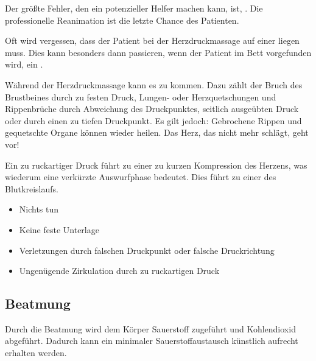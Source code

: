 {
Der größte Fehler, den ein potenzieller Helfer machen
kann, ist, . Die professionelle
Reanimation ist die letzte Chance des Patienten. 

Oft wird vergessen, dass der Patient bei der
Herzdruckmassage auf einer  liegen
muss. Dies kann besonders dann passieren, wenn der Patient
im Bett vorgefunden wird, ein .

Während der Herzdruckmassage kann es zu  kommen.
Dazu zählt der Bruch des Brustbeines durch zu festen Druck,
Lungen- oder Herzquetschungen und Rippenbrüche durch
Abweichung des Druckpunktes, seitlich ausgeübten Druck oder
durch einen zu tiefen Druckpunkt. Es gilt jedoch: Gebrochene
Rippen und gequetschte Organe können wieder heilen. Das
Herz, das nicht mehr schlägt, geht vor!


Ein zu ruckartiger Druck führt zu einer zu kurzen
Kompression des Herzens, was wiederum eine verkürzte
Auswurfphase bedeutet. Dies führt zu einer  des Blutkreislaufs.

}{
\begin{itemize}
  \item Nichts tun
  \item Keine feste Unterlage
  \item Verletzungen durch falschen Druckpunkt oder falsche
  Druckrichtung
  \item Ungenügende Zirkulation durch zu ruckartigen Druck
\end{itemize}
}{}{}{}

\subsection{Beatmung}

Durch die Beatmung wird dem Körper Sauerstoff zugeführt und
Kohlendioxid abgeführt. Dadurch kann ein minimaler
Sauerstoffaustausch künstlich aufrecht erhalten werden.








